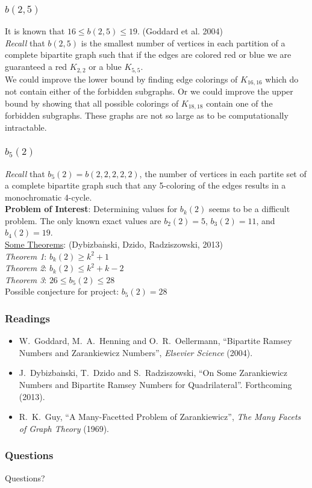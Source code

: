\documentclass[pdf,hyperref={urlbordercolor={0 1 1}},xcolor=pdftex,dvipsnames]{beamer}
\begin{document}
\begin{frame}
  \frametitle{$b(2,5)$}
  It is known that $16\le b(2,5)\le19$. (Goddard et al. 2004) \\\vspace{.25cm} 
  \textit{Recall} that $b(2,5)$ is the smallest number of vertices in each partition of a complete 
    bipartite graph such that if the edges are colored red or blue we are guaranteed a 
    red $K_{2,2}$ or a blue $K_{5,5}$.\\\vspace{.25cm}
  We could improve the lower bound by finding edge colorings of $K_{16,16}$ which do not
    contain either of the forbidden subgraphs. Or we could improve the upper bound by 
    showing that all possible colorings of $K_{18,18}$ contain one of the forbidden 
    subgraphs. These graphs are not so large as to be computationally intractable.
\end{frame}


\begin{frame}
  \frametitle{$b_5(2)$}
  \textit{Recall} that $b_5(2)=b(2,2,2,2,2)$, the number of vertices in each partite set of a 
    complete bipartite graph such that any 5-coloring of the edges results in a monochromatic 
    4-cycle.\\\vspace{.25cm}
  \textbf{Problem of Interest}: Determining values for $b_k(2)$ seems to be a difficult problem. 
    The only known exact values are $b_2(2) = 5$, $b_3(2) = 11$, and $b_4(2) = 19$. \\
    \vspace{.25cm}
  \underline{Some Theorems}: (Dybizba$\acute{\text{n}}$ski, Dzido, Radziszowski, 2013) \\\vspace{.25cm} 
  \textit{Theorem 1}:  $b_k(2) \ge k^2 + 1$  \\\vspace{.25cm} 
  \textit{Theorem 2}: $b_k(2) \le k^2 + k -2$ \\\vspace{.25cm}
  \textit{Theorem 3}: $26 \le b_5(2) \le 28$ \\\vspace{.25cm}
  Possible conjecture for project: $b_5(2) = 28$
\end{frame}

\begin{frame}
  \frametitle{Readings}
  \begin{itemize}
    \item W.~Goddard, M.~A.~Henning and O.~R.~Oellermann, ``Bipartite Ramsey Numbers and 
      Zarankiewicz Numbers'', \textit{Elsevier Science} (2004).
    \item J.~Dybizba$\acute{\text{n}}$ski, T.~Dzido and S.~Radziszowski, ``On Some
      Zarankiewicz Numbers and Bipartite Ramsey Numbers for Quadrilateral''. Forthcoming (2013).
    \item R.~K.~Guy, ``A Many-Facetted Problem of Zarankiewicz'', \textit{The Many Facets of
      Graph Theory} (1969).
  \end{itemize}
\end{frame}

\begin{frame}
  \frametitle{Questions}
  \begin{center}
    {\Large Questions?}
  \end{center}
\end{frame}
\end{document}
